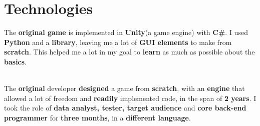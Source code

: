 	\section*{Technologies}
		\par The \textbf{original game} is implemented in \textbf{Unity}(a game engine) with \textbf{C\#}. I used \textbf{Python} and a \textbf{library}, leaving me a lot of \textbf{GUI elements} to make from \textbf{scratch}. This helped me a lot in my goal to \textbf{learn} as much as possible about the \textbf{basics}. \\ \\


	\par The \textbf{original} developer \textbf{designed} a game from \textbf{scratch}, with an \textbf{engine} that allowed a lot of freedom and \textbf{readily} implemented code, in the span of \textbf{2 years}. I took the role of \textbf{data analyst, tester, target audience} and \textbf{core back-end programmer} for \textbf{three months}, in a \textbf{different language}.

\newpage


